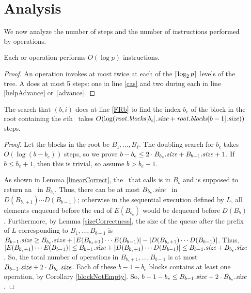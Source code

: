 
\section{Analysis}
\label{sec-analysis}

We now analyze the number of steps and the number of  instructions performed by operations.

\begin{proposition}\label{casbound}
Each  or  operation performs $O(\log p)$  instructions.
\end{proposition}
\begin{proof}
An operation invokes  at most twice at each of the $\lceil \log_2 p \rceil$ levels of the tree.
A  does at most 5  steps: one in line \ref{cas} and two during each  in line \ref{helpAdvance} or~\ref{advance}.
\end{proof}

\begin{lemma}\label{dSearchTime}
The search that $(b,i)$ does at line \ref{FRb} to find the index $b_e$ of the block in the root containing the $e$th \enqueue\ takes $O(\log (\mbox{\textnormal{\textit{root}}}.\mbox{\textit{blocks}}[b_e].\mbox{\textit{size}} + \mbox{\textnormal{\textit{root}}}.\mbox{\textit{blocks}}[b-1].\mbox{\textit{size}}))$ steps.
\end{lemma}
\begin{proof}
Let the blocks in the root be $B_1, \ldots, B_\ell$.
The doubling search for $b_e$ takes $O(\log (b-b_e))$ steps,
so we prove $b - b_e \leq 2 \cdot B_{b_e}.\mbox{\textit{size}} + B_{b-1}.\mbox{\textit{size}} + 1$.
If $b \leq b_e+1$, then this is trivial, so assume  $b>b_e+1$.

As shown in Lemma \ref{linearCorrect}, the \dequeue\ that calls  is in $B_b$ and is supposed to return an \enqueue\ in $B_{b_e}$.
Thus, there can be at most $B_{b_e}.\mbox{\textit{size}}$ \dequeues\ in 
$D(B_{b_e+1}) \cdots D(B_{b-1})$; otherwise in the sequential execution defined by $L$,
all elements enqueued before the end of
$E(B_{b_e})$ would be dequeued before $D(B_b)$. 
Furthermore, by Lemma \ref{sizeCorrectness}, the size of the queue  after the prefix of $L$ corresponding to 
$B_1,\ldots,B_{b-1}$  is 
$B_{b-1}.\mbox{\textit{size}} \geq B_{b_e}.size + |E(B_{b_e+1})\cdots E(B_{b-1})| - |D(B_{b_e+1})\cdots D(B_{b-1})|$.
Thus, $|E(B_{b_e+1})\cdots E(B_{b-1})| \leq B_{b-1}.\mbox{\textit{size}} + |D(B_{b_e+1})\cdots D(B_{b-1})| \leq B_{b-1}.\mbox{\textit{size}} + B_{b_e}.\mbox{\textit{size}}$.
So, the total number of operations in $B_{b_e+1}, \ldots, B_{b-1}$ is at most
$B_{b-1}.\mbox{\textit{size}} + 2\cdot B_{b_e}.\mbox{\textit{size}}$.
Each of these $b-1-b_e$ blocks contains at least one operation, by Corollary \ref{blockNotEmpty}.
So, $b-1-b_e \leq B_{b-1}.\mbox{\textit{size}} + 2\cdot B_{b_e}.\mbox{\textit{size}}$.
\end{proof}

